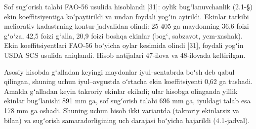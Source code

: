 Sof sugʻorish talabi FAO-56 usulida hisoblandi {[}31{]}: oylik
bugʻlanuvchanlik (2.1-§) ekin koeffitsiyentiga koʻpaytirildi va undan
foydali yogʻin ayirildi. Ekinlar tarkibi meliorativ kadastrning kontur
jadvalidan olindi: 25 405 ga maydonning 36,6 foizi gʻoʻza, 42,5 foizi
gʻalla, 20,9 foizi boshqa ekinlar (bogʻ, sabzavot, yem-xashak). Ekin
koeffitsiyentlari FAO-56 boʻyicha oylar kesimida olindi {[}31{]},
foydali yogʻin USDA SCS usulida aniqlandi. Hisob natijalari 47-ilova va
48-ilovada keltirilgan.

Asosiy hisobda gʻalladan keyingi maydonlar iyul--sentabrda boʻsh deb
qabul qilingan, shuning uchun iyul--avgustda oʻrtacha ekin
koeffitsiyenti 0,62 ga tushadi. Amalda gʻalladan keyin takroriy ekinlar
ekiladi; ular hisobga olinganda yillik ekinlar bugʻlanishi 891 mm ga,
sof sugʻorish talabi 696 mm ga, iyuldagi talab esa 178 mm ga oshadi.
Shuning uchun hisob ikki variantda (takroriy ekinlarsiz va bilan) va
sugʻorish samaradorligining uch darajasi boʻyicha bajarildi
(4.1-jadval).



